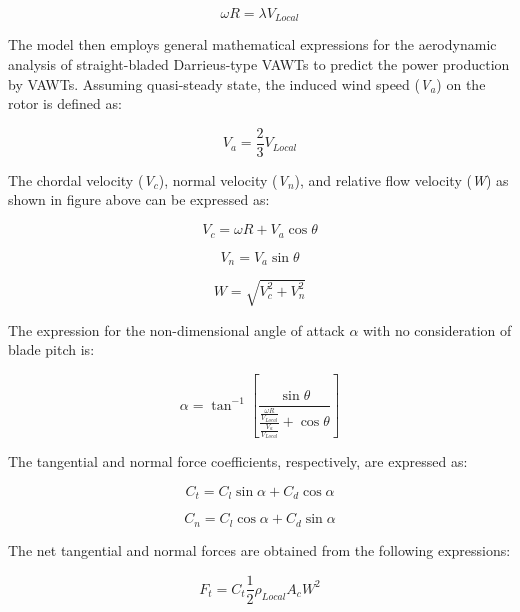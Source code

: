 \begin{equation}
\omega R = \lambda {V_{Local}}
\end{equation}

The model then employs general mathematical expressions for the aerodynamic analysis of straight-bladed Darrieus-type VAWTs to predict the power production by VAWTs. Assuming quasi-steady state, the induced wind speed (\emph{V\(_{a}\)}) on the rotor is defined as:

\begin{equation}
{V_a} = \frac{2}{3}{V_{Local}}
\end{equation}

The chordal velocity (\emph{V\(_{c}\)}), normal velocity (\emph{V\(_{n}\)}), and relative flow velocity (\emph{W}) as shown in figure above can be expressed as:

\begin{equation}
{V_c} = \omega R + {V_a}\cos \theta
\end{equation}

\begin{equation}
{V_n} = {V_a}\sin \theta
\end{equation}

\begin{equation}
W = \sqrt {V_c^2 + V_n^2}
\end{equation}

The expression for the non-dimensional angle of attack \(\alpha\) with no consideration of blade pitch is:

\begin{equation}
\alpha  = {\tan ^{ - 1}}\left[ {\frac{{\sin \theta }}{{\frac{{\frac{{\omega R}}{{V_{Local}}}}}{{\frac{{V_a}}{{V_{Local}}}}} + \cos \theta }}} \right]
\end{equation}

The tangential and normal force coefficients, respectively, are expressed as:

\begin{equation}
{C_t} = {C_l}\sin \alpha  + {C_d}\cos \alpha
\end{equation}

\begin{equation}
{C_n} = {C_l}\cos \alpha  + {C_d}\sin \alpha
\end{equation}

The net tangential and normal forces are obtained from the following expressions:

\begin{equation}
{F_t} = {C_t}\frac{1}{2}{\rho_{Local}}{A_c}{W^2}
\end{equation}

